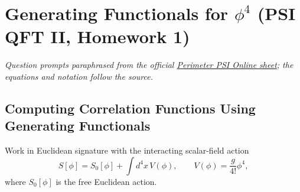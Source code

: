 \section{Generating Functionals for $\phi^4$ (PSI QFT II, Homework 1)}

\noindent\textit{Question prompts paraphrased from the official
\href{https://psi-online.perimeterinstitute.ca/courses/take/quantum-field-theory-ii-student/pdfs/20776374-module-3-homework}{Perimeter PSI Online sheet};
the equations and notation follow the source.}

\subsection{Computing Correlation Functions Using Generating Functionals}

Work in Euclidean signature with the interacting scalar-field action
\begin{equation}
    S[\phi]=S_0[\phi]+\int d^4x\,V(\phi),
    \qquad
    V(\phi)=\frac{g}{4!}\phi^4,
\end{equation}
where $S_0[\phi]$ is the free Euclidean action.

